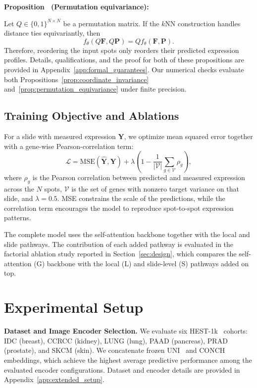 \documentclass[11pt]{article}
\begin{document}
\par\noindent{}\textbf{Proposition \theproposition\ (Permutation equivariance):}\label{prop:permutation_equivariance}\par
Let $Q\in\{0,1\}^{N\times N}$ be a permutation matrix. If the $k$NN construction handles distance
ties equivariantly, then
\begin{equation}
f_\theta(Q\mathbf{F},Q\mathbf{P})=Qf_\theta(\mathbf{F},\mathbf{P}).
\end{equation}
Therefore, reordering the input spots only reorders their predicted expression profiles.
Details, qualifications, and the proof for both of these propositions are provided in
Appendix~\ref{app:formal_guarantees}. Our numerical checks evaluate both
Propositions~\ref{prop:coordinate_invariance} and~\ref{prop:permutation_equivariance} under finite
precision.


\subsection{Training Objective and Ablations}
\label{sec:loss}
For a slide with measured expression $\mathbf{Y}$, we optimize mean squared error together with a
gene-wise Pearson-correlation term:
\begin{equation}
\mathcal{L}=\mathrm{MSE}(\hat{\mathbf{Y}},\mathbf{Y})
+ \lambda\left(1-\frac{1}{|\mathcal{V}|}\sum_{g\in\mathcal{V}}\rho_g\right),
\end{equation}
where $\rho_g$ is the Pearson correlation between predicted and measured expression across the $N$
spots, $\mathcal{V}$ is the set of genes with nonzero target variance on that slide, and
$\lambda=0.5$. MSE constrains the scale of the predictions, while the correlation term encourages
the model to reproduce spot-to-spot expression patterns.

The complete model uses the self-attention backbone together with the local and slide pathways. The
contribution of each added pathway is evaluated in the factorial ablation study reported in
Section~\ref{sec:design}, which compares the self-attention (G) backbone with the local (L) and slide-level
(S) pathways added on top.

\section{Experimental Setup}
\label{sec:setup}
\noindent\textbf{Dataset and Image Encoder Selection.}\quad
We evaluate six HEST-1k~\cite{jaume2024hest} cohorts:
IDC (breast), CCRCC (kidney), LUNG (lung), PAAD (pancreas),
PRAD (prostate), and SKCM (skin). We concatenate frozen
UNI~\cite{chen2024uni} and CONCH~\cite{lu2024conch} embeddings,
which achieve the highest average predictive performance among
the evaluated encoder configurations. Dataset and encoder details
are provided in Appendix~\ref{app:extended_setup}.
\end{document}
